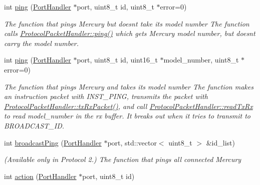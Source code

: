 \begin{DoxyCompactItemize}
int \hyperlink{classmercury_1_1_protocol_packet_handler_a6a34fbd6bd9cbcedf87e5c8341be7ca0}{ping} (\hyperlink{classmercury_1_1_port_handler}{Port\+Handler} $\ast$port, uint8\+\_\+t id, uint8\+\_\+t $\ast$error=0)
\begin{DoxyCompactList}\small\item\em The function that pings Mercury but doesn\textquotesingle{}t take its model number  The function calls \hyperlink{classmercury_1_1_protocol_packet_handler_a6a34fbd6bd9cbcedf87e5c8341be7ca0}{Protocol\+Packet\+Handler\+::ping()} which gets Mercury model number,  but doesn\textquotesingle{}t carry the model number. \end{DoxyCompactList}\item 
int \hyperlink{classmercury_1_1_protocol_packet_handler_a5096f7bcb97faf46ed7b363c509283a6}{ping} (\hyperlink{classmercury_1_1_port_handler}{Port\+Handler} $\ast$port, uint8\+\_\+t id, uint16\+\_\+t $\ast$model\+\_\+number, uint8\+\_\+t $\ast$error=0)
\begin{DoxyCompactList}\small\item\em The function that pings Mercury and takes its model number  The function makes an instruction packet with I\+N\+S\+T\+\_\+\+P\+I\+NG,  transmits the packet with \hyperlink{classmercury_1_1_protocol_packet_handler_a68b02f23af616886d0795ea12debd613}{Protocol\+Packet\+Handler\+::tx\+Rx\+Packet()},  and call \hyperlink{classmercury_1_1_protocol_packet_handler_a368325ca9c0c783b1e88ef32a4544e51}{Protocol\+Packet\+Handler\+::read\+Tx\+Rx} to read model\+\_\+number in the rx buffer.  It breaks out  when it tries to transmit to B\+R\+O\+A\+D\+C\+A\+S\+T\+\_\+\+ID. \end{DoxyCompactList}\item 
int \hyperlink{classmercury_1_1_protocol_packet_handler_a3cbeb97b8a4a955180a54255a0931d2d}{broadcast\+Ping} (\hyperlink{classmercury_1_1_port_handler}{Port\+Handler} $\ast$port, std\+::vector$<$ uint8\+\_\+t $>$ \&id\+\_\+list)
\begin{DoxyCompactList}\small\item\em (Available only in Protocol 2.) The function that pings all connected Mercury \end{DoxyCompactList}\item 
int \hyperlink{classmercury_1_1_protocol_packet_handler_a55034471e726b363c0a535acb1012468}{action} (\hyperlink{classmercury_1_1_port_handler}{Port\+Handler} $\ast$port, uint8\+\_\+t id)

\end{DoxyCompactItemize}
